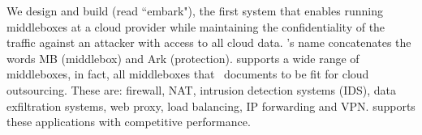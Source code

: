 %    
%    
% 
     
     
     
  
    We design and build \sys (read ``embark"), the first system that enables running middleboxes at a cloud provider while maintaining the confidentiality of the traffic against an attacker with access to all cloud data.  \sys's name concatenates the words MB (middlebox) and Ark (protection). \sys supports a wide range of middleboxes, in fact, all middleboxes that~\cite{aplomb} documents to be fit for cloud outsourcing. These are: firewall, NAT, intrusion detection systems (IDS), data exfiltration systems, web proxy, load balancing, IP forwarding and VPN. \sys supports these applications with competitive performance. 
    
